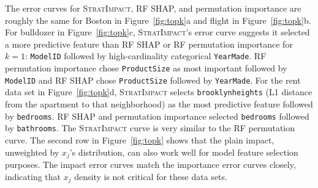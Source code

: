 \documentclass[smallextended]{svjour3}       %
\newcommand{\figref}[1]{Figure~\ref{#1}}
\newcommand{\simp}{\fontfamily{cmr}\textsc{\small StratImpact}}
\begin{document}
The error curves for \simp, RF SHAP, and permutation importance are roughly the same for Boston in \figref{fig:topk}a and flight in \figref{fig:topk}b. For bulldozer in \figref{fig:topk}c, \simp's error curve suggests it selected a more predictive feature than RF SHAP or RF permutation importance for $k=1$: {\tt ModelID}  followed by high-cardinality categorical {\tt YearMade}. RF permutation importance chose {\tt ProductSize} as most important followed by {\tt ModelID} and RF SHAP chose {\tt ProductSize} followed by {\tt YearMade}. For the rent data set in \figref{fig:topk}d, \simp{} selects {\tt brooklynheights} (L1 distance from the apartment to that neighborhood) as the most predictive feature followed by {\tt bedrooms}.  RF SHAP and permutation importance selected {\tt bedrooms} followed by {\tt bathrooms}.  The \simp{} curve is very similar to the RF permutation curve.   The second row in \figref{fig:topk} shows that the plain impact, unweighted by $x_j$'s  distribution, can also work well for model feature selection purposes.  The impact error curves match the importance error curves closely, indicating that $x_j$ density is not critical for these data sets.
\end{document}
